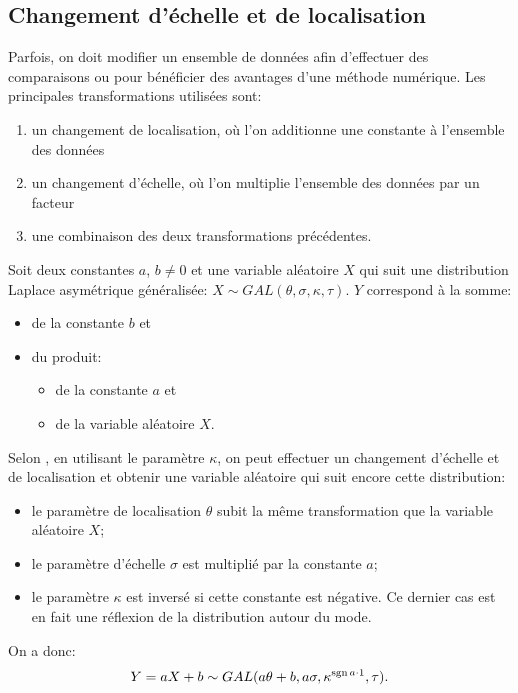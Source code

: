 \subsection{Changement d'échelle et de localisation}
\label{sec:transGAL}

Parfois, on doit modifier un ensemble de données afin d'effectuer des
comparaisons ou pour bénéficier des avantages d'une méthode
numérique. Les principales transformations utilisées sont:
\begin{enumerate}
\item un changement de localisation, où l'on additionne une constante
  à l'ensemble des données
\item un changement d'échelle, où l'on multiplie l'ensemble des
  données par un facteur
\item une combinaison des deux transformations précédentes.
\end{enumerate}

Soit deux constantes $a$, $b\neq0$ et une variable aléatoire $X$ qui
suit une distribution Laplace asymétrique généralisée: $X \sim
GAL(\theta,\sigma,\kappa,\tau)$. $Y$ correspond à la somme:
\begin{itemize}
\item de la constante $b$ et
\item du produit:
  \begin{itemize}
  \item de la constante $a$ et
  \item de la variable aléatoire $X$.
  \end{itemize}
\end{itemize}

Selon \cite{kotz2001laplace}, en utilisant le paramètre $\kappa$, on
peut effectuer un changement d'échelle et de localisation et obtenir
une variable aléatoire qui suit encore cette distribution:
\begin{itemize}
\item le paramètre de localisation $\theta$ subit la même
  transformation que la variable aléatoire $X$;
\item le paramètre d'échelle $\sigma$ est multiplié par la constante
  $a$;
\item le paramètre $\kappa$ est inversé si cette constante est
  négative. Ce dernier cas est en fait une réflexion de la
  distribution autour du mode.
\end{itemize}

On a donc:
\begin{align}
  \label{eq:GALscaletrans}
  Y = aX + b \sim GAL(a \theta + b,a\sigma,\kappa^{\operatorname{sgn}{a}\cdot
    1},\tau).
\end{align}

